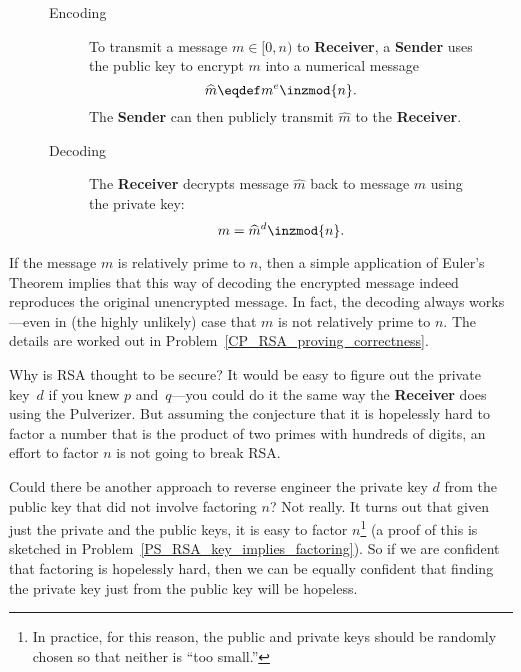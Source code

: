 \begin{figure}[p]
{\begin{minipage}{\textwidth}
\begin{description}
\item[Encoding]

\iffalse

Given a message~$m$, the sender first checks that $\gcd(m, n) =
1$.\footnote{It would be very bad if $\gcd(m, n)$ equals $p$ or $q$
  since then it would be easy for someone to use the encoded message
  to compute the private key If $\gcd(m, n) = n$, then the encoded
  message would be~0, which is fairly useless.  For very large values
  of~$n$, it is extremely unlikely that $\gcd(m, n) \ne 1$.  If this
  does happen, you should get a new set of keys or, at the very least,
  add some bits to~$m$ so that the resulting message is relatively
  prime to~$n$.}
\fi

To transmit a message $m \in [0,n)$ to \textbf{Receiver}, a \textbf{Sender} uses the public
  key to encrypt $m$ into a numerical message
\[
\widehat{m} \eqdef m^e \inzmod{n}. %
\]
The \textbf{Sender} can then publicly transmit $\widehat{m}$ to the \textbf{Receiver}.

\item[Decoding] The \textbf{Receiver} decrypts message $\widehat{m}$ back to message $m$ using the
  private key:
\[
m = \widehat{m}^d \inzmod{n}. %
\]
\end{description}

\end{minipage}
}
\end{figure}

If the message $m$ is relatively prime to $n$, then a simple
application of Euler's Theorem implies that this way of decoding the
encrypted message indeed reproduces the original unencrypted message.
In fact, the decoding always works---even in (the highly unlikely)
case that $m$ is not relatively prime to $n$.  The details are worked
out in Problem~\ref{CP_RSA_proving_correctness}.

Why is RSA thought to be secure?  It would be easy to figure out the
private key~$d$ if you knew $p$ and~$q$---you could do it the same
way the \textbf{Receiver} does using the Pulverizer.  But assuming the
conjecture that it is hopelessly hard to factor a number that is the
product of two primes with hundreds of digits, an effort to factor $n$
is not going to break RSA.

Could there be another approach to reverse engineer the private key
$d$ from the public key that did not involve factoring $n$?  Not
really.  It turns out that given just the private and the public keys,
it is easy to factor $n$\footnote{In practice, for this reason, the
  public and private keys should be randomly chosen so that neither is
  ``too small.''}  (a proof of this is sketched in
Problem~\ref{PS_RSA_key_implies_factoring}).  So if we are confident
that factoring is hopelessly hard, then we can be equally confident
that finding the private key just from the public key will be
hopeless.

